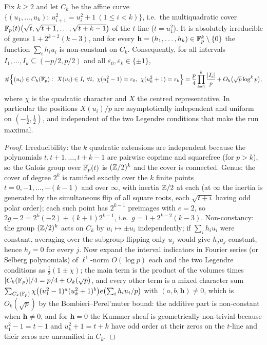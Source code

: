 
\begin{lemma}\label{lem:run}
Fix $k\ge2$ and let $C_k$ be the affine curve
$\{(u_1,\dots,u_k):\ u_{i+1}^2=u_i^2+1\ (1\le i<k)\}$, i.e.\ the multiquadratic cover
$\mathbb{F}_p(t)\bigl(\sqrt t,\sqrt{t+1},\dots,\sqrt{t+k-1}\bigr)$ of the $t$-line ($t=u_1^2$).  It is absolutely irreducible of genus
$1+2^{k-2}(k-3)$, and for every $\mathbf h=(h_1,\dots,h_k)\in\mathbb{F}_p^k\setminus\{0\}$ the function $\sum_ih_iu_i$ is non-constant on $C_k$.
Consequently, for all intervals $I_1,\dots,I_k\subseteq(-p/2,p/2)$ and all $\varepsilon_0,\varepsilon_k\in\{\pm1\}$,
\[
 \#\Bigl\{(u_i)\in C_k(\Fp):\ X(u_i)\in I_i\ \forall i,\ \chi(u_1^2-1)=\varepsilon_0,\ \chi(u_k^2+1)=\varepsilon_k\Bigr\}
 =\frac p4\prod_{i=1}^k\frac{|I_i|}p+O_k\bigl(\sqrt p\log^kp\bigr),
\]
where $\chi$ is the quadratic character and $X$ the centred representative.  In particular the positions $X(u_i)/p$ are asymptotically
independent and uniform on $(-\frac12,\frac12)$, and independent of the two Legendre conditions that make the run maximal.
\end{lemma}
\begin{proof}
Irreducibility: the $k$ quadratic extensions are independent because the polynomials $t,t+1,\dots,t+k-1$ are pairwise coprime and squarefree
(for $p>k$), so the Galois group over $\overline{\mathbb{F}_p}(t)$ is $(\mathbb{Z}/2)^k$ and the cover is connected.  Genus: the cover of degree $2^k$ is
ramified exactly over the $k$ finite points $t=0,-1,\dots,-(k-1)$ and over $\infty$, with inertia $\mathbb{Z}/2$ at each (at $\infty$ the inertia is
generated by the simultaneous flip of all square roots, each $\sqrt{t+i}$ having odd polar order); each such point has $2^{k-1}$ preimages
with $e=2$, so $2g-2=2^k(-2)+(k+1)2^{k-1}$, i.e.\ $g=1+2^{k-2}(k-3)$.  Non-constancy: the group $(\mathbb{Z}/2)^k$ acts on $C_k$ by
$u_i\mapsto\pm u_i$ independently; if $\sum_ih_iu_i$ were constant, averaging over the subgroup flipping only $u_j$ would give $h_ju_j$
constant, hence $h_j=0$ for every $j$.  Now expand the interval indicators in Fourier series (or Selberg polynomials) of $\ell^1$-norm
$O(\log p)$ each and the two Legendre conditions as $\frac12(1\pm\chi)$; the main term is the product of the volumes times
$|C_k(\mathbb{F}_p)|/4=p/4+O_k(\sqrt p)$, and every other term is a mixed character sum
$\sum_{C_k(\mathbb{F}_p)}\chi\bigl((u_1^2-1)^{a}(u_k^2+1)^{b}\bigr)e\bigl(\sum_ih_iu_i/p\bigr)$ with $(a,b,\mathbf h)\ne0$, which is $O_k(\sqrt p)$ by the
Bombieri--Perel'muter bound: the additive part is non-constant when $\mathbf h\ne0$, and for $\mathbf h=0$ the Kummer sheaf is geometrically
non-trivial because $u_1^2-1=t-1$ and $u_k^2+1=t+k$ have odd order at their zeros on the $t$-line and their zeros are unramified in $C_k$.
\end{proof}

